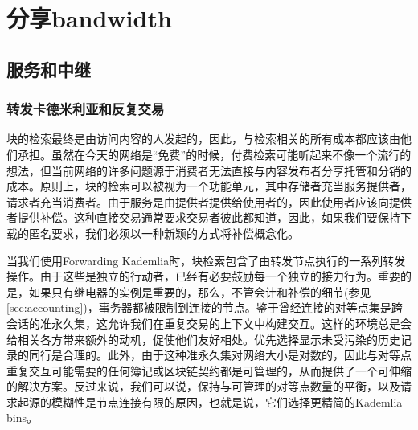 

\section{分享bandwidth\statusgreen}

\green{}

\subsection{服务和中继}\label{sec:incentives-relaying}

\green{}

\subsubsection{转发卡德米利亚和反复交易}

块的检索最终是由访问内容的人发起的，因此，与检索相关的所有成本都应该由他们承担。虽然在今天的网络是“免费”的时候，付费检索可能听起来不像一个流行的想法，但当前网络的许多问题源于消费者无法直接与内容发布者分享托管和分销的成本。原则上，块的检索可以被视为一个功能单元，其中存储者充当服务提供者，请求者充当消费者。由于服务是由提供者提供给使用者的，因此使用者应该向提供者提供补偿。这种直接交易通常要求交易者彼此都知道，因此，如果我们要保持下载的匿名要求，我们必须以一种新颖的方式将补偿概念化。 

当我们使用Forwarding Kademlia时，块检索包含了由转发节点执行的一系列转发操作。由于这些是独立的行动者，已经有必要鼓励每一个独立的接力行为。重要的是，如果只有继电器的实例是重要的，那么，不管会计和补偿的细节(参见\ref{sec:accounting})，事务器都被限制到连接的节点。鉴于曾经连接的对等点集是跨会话的准永久集，这允许我们在重复交易的上下文中构建交互。这样的环境总是会给相关各方带来额外的动机，促使他们友好相处。优先选择显示未受污染的历史记录的同行是合理的。此外，由于这种准永久集对网络大小是对数的，因此与对等点重复交互可能需要的任何簿记或区块链契约都是可管理的，从而提供了一个可伸缩的解决方案。反过来说，我们可以说，保持与可管理的对等点数量的平衡，以及请求起源的模糊性是节点连接有限的原因，也就是说，它们选择更精简的Kademlia bins。

